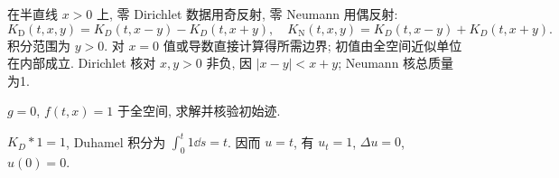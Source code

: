 在半直线 $x>0$ 上, 零 Dirichlet 数据用奇反射, 零 Neumann 用偶反射:
\[
K_{\mathrm D}(t,x,y)=K_D(t,x-y)-K_D(t,x+y),\quad
K_{\mathrm N}(t,x,y)=K_D(t,x-y)+K_D(t,x+y).
\]
积分范围为 $y>0$. 对 $x=0$ 值或导数直接计算得所需边界; 初值由全空间近似单位在内部成立. Dirichlet 核对 $x,y>0$ 非负, 因 $|x-y|<x+y$; Neumann 核总质量为1.
\begin{exercise}
$g=0$, $f(t,x)=1$ 于全空间, 求解并核验初始迹.
\end{exercise}
\begin{solution}
$K_D*1=1$, Duhamel 积分为 $\int_0^t1\dd s=t$. 因而 $u=t$, 有 $u_t=1$, $\Delta u=0$, $u(0)=0$.
\end{solution}
